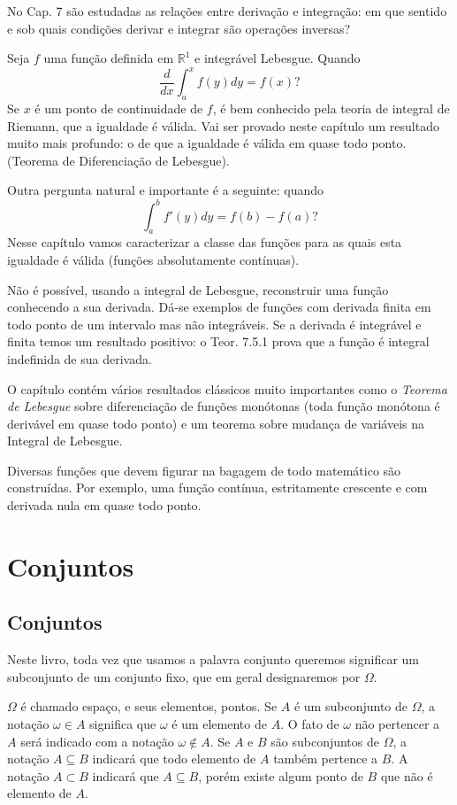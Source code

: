 \documentclass[
]{book}
\begin{document}
No Cap. 7 são estudadas as relações entre derivação e integração: em que sentido e sob quais condições derivar e integrar são operações inversas?

Seja \(f\) uma função definida em \(\mathbb{R}^1\) e integrável Lebesgue. Quando \[ \frac{d}{dx} \int_{a}^{x} f(y) dy = f(x)? \] Se \(x\) é um ponto de continuidade de \(f\), é bem conhecido pela teoria de integral de Riemann, que a igualdade é válida. Vai ser provado neste capítulo um resultado muito mais profundo: o de que a igualdade é válida em quase todo ponto. (Teorema de Diferenciação de Lebesgue).

Outra pergunta natural e importante é a seguinte: quando \[ \int_{a}^{b} f'(y) dy = f(b) - f(a)? \] Nesse capítulo vamos caracterizar a classe das funções para as quais esta igualdade é válida (funções absolutamente contínuas).

Não é possível, usando a integral de Lebesgue, reconstruir uma função conhecendo a sua derivada. Dá-se exemplos de funções com derivada finita em todo ponto de um intervalo mas não integráveis. Se a derivada é integrável e finita temos um resultado positivo: o Teor. 7.5.1 prova que a função é integral indefinida de sua derivada.

O capítulo contém vários resultados clássicos muito importantes como o \emph{Teorema de Lebesgue} sobre diferenciação de funções monótonas (toda função monótona é derivável em quase todo ponto) e um teorema sobre mudança de variáveis na Integral de Lebesgue.

Diversas funções que devem figurar na bagagem de todo matemático são construídas. Por exemplo, uma função contínua, estritamente crescente e com derivada nula em quase todo ponto.

\chapter{Conjuntos}\label{conjuntos}

\section{Conjuntos}\label{conjuntos-1}

Neste livro, toda vez que usamos a palavra conjunto queremos significar um subconjunto de um conjunto fixo, que em geral designaremos por \(\Omega\).

\(\Omega\) é chamado espaço, e seus elementos, pontos.
Se \(A\) é um subconjunto de \(\Omega\), a notação \(\omega \in A\) significa que \(\omega\) é um elemento de \(A\).
O fato de \(\omega\) não pertencer a \(A\) será indicado com a notação \(\omega \notin A\).
Se \(A\) e \(B\) são subconjuntos de \(\Omega\), a notação \(A \subseteq B\) indicará que todo elemento de \(A\) também pertence a \(B\).
A notação \(A \subset B\) indicará que \(A \subseteq B\), porém existe algum ponto de \(B\) que não é elemento de \(A\).
\end{document}
